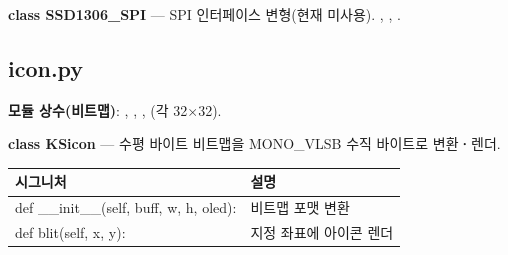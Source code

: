 \noindent\textbf{class SSD1306\_SPI} --- SPI 인터페이스 변형(현재 미사용).
,
, .

\subsection{icon.py}

\noindent\textbf{모듈 상수(비트맵)}: , ,
,  (각 32$\times$32).

\noindent\textbf{class KSicon} --- 수평 바이트 비트맵을 MONO\_VLSB 수직 바이트로 변환\textbf{·}렌더.

\begin{longtable}{S{7.4cm} L{6.6cm}}
\toprule
{}\normalfont\sffamily\bfseries 시그니처 & \normalfont\sffamily\bfseries 설명 \\
\midrule
\endhead
def \_\_init\_\_(self, buff, w, h, oled): & 비트맵 포맷 변환 \\
def blit(self, x, y): & 지정 좌표에 아이콘 렌더 \\
\bottomrule
\end{longtable}
